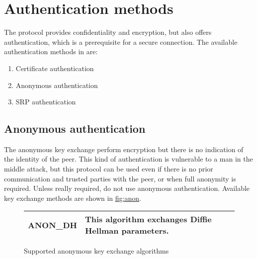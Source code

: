 \chapter{Authentication methods}

The \tls{} protocol provides confidentiality and encryption, but
also offers authentication, which is a prerequisite
for a secure connection. 
The available authentication methods in \gnutls{} are:
\begin{enumerate}
 \item Certificate authentication
 \item Anonymous authentication
 \item SRP authentication
\end{enumerate}



\section{Anonymous authentication}
The anonymous key exchange perform encryption but there is no indication of 
the identity of the peer. This kind of authentication is vulnerable to a
man in the middle attack, 
but this protocol can be used even if there is no prior communication and
trusted parties with the peer, or when full anonymity is required.
Unless really required, do not use anonymous authentication.
Available key exchange methods are shown in \hyperref{figure}{figure }{}{fig:anon}.

\begin{figure}[hbtp]
\begin{tabular}{|l|p{9cm}|}

\hline
ANON\_DH & This algorithm exchanges Diffie Hellman parameters. 
\\
\hline
\end{tabular}

\caption{Supported anonymous key exchange algorithms}
\label{fig:anon}

\end{figure}


